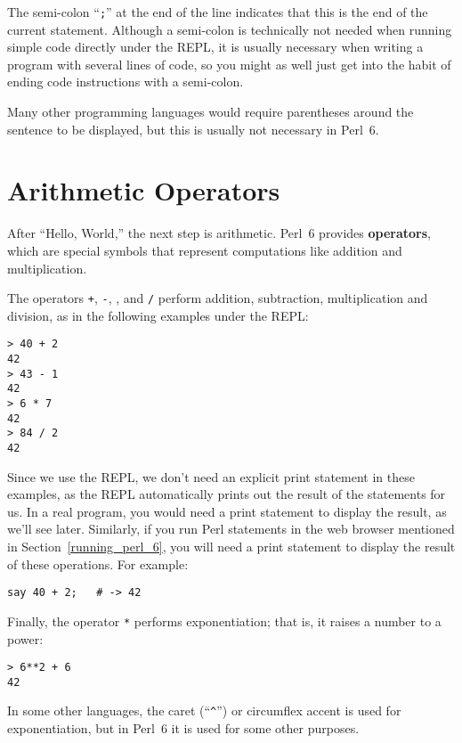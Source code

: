 The semi-colon ``{\tt ;}'' at the end of the line indicates 
that this is the end of the current statement. Although a 
semi-colon is technically not needed when running 
simple code directly under the REPL, it is usually 
necessary when writing a program with several lines of code, 
so you might as well just get into the habit of ending code 
instructions with a semi-colon.

Many other programming languages would require parentheses 
around the sentence to be displayed, but this is usually 
not necessary in Perl~6.

\section{Arithmetic Operators}

After ``Hello, World,'' the next step is arithmetic.  Perl~6 provides
{\bf operators}, which are special symbols that represent computations
like addition and multiplication.  

The operators {\tt +}, {\tt -}, {\tt *}, and {\tt /} perform addition,
subtraction, multiplication and division, as in the following examples
under the REPL:

\begin{verbatim}
> 40 + 2
42
> 43 - 1
42
> 6 * 7
42
> 84 / 2
42
\end{verbatim}
%

Since we use the REPL, we don't need an explicit print 
statement in these examples, as the REPL automatically 
prints out the result of the statements for us. In a real 
program, you would need a print statement to display 
the result, as we'll see later. Similarly, if you run 
Perl statements in the web browser mentioned in 
Section~\ref{running_perl_6}, you will need a 
print statement to display the result of these operations. 
For example:

\begin{verbatim}
say 40 + 2;   # -> 42
\end{verbatim}


Finally, the operator {\tt **} performs exponentiation; that is,
it raises a number to a power:

\begin{verbatim}
> 6**2 + 6
42
\end{verbatim}
%
In some other languages, the caret (``\verb"^"'') or 
circumflex accent is used for exponentiation, but in 
Perl~6 it is used for some other purposes.
%


